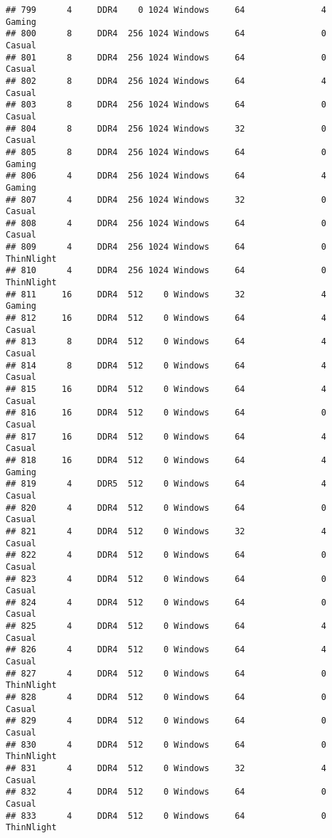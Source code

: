 \documentclass[
]{article}
\begin{document}
\begin{verbatim}
## 799      4     DDR4    0 1024 Windows     64               4     Gaming
## 800      8     DDR4  256 1024 Windows     64               0     Casual
## 801      8     DDR4  256 1024 Windows     64               0     Casual
## 802      8     DDR4  256 1024 Windows     64               4     Casual
## 803      8     DDR4  256 1024 Windows     64               0     Casual
## 804      8     DDR4  256 1024 Windows     32               0     Casual
## 805      8     DDR4  256 1024 Windows     64               0     Gaming
## 806      4     DDR4  256 1024 Windows     64               4     Gaming
## 807      4     DDR4  256 1024 Windows     32               0     Casual
## 808      4     DDR4  256 1024 Windows     64               0     Casual
## 809      4     DDR4  256 1024 Windows     64               0 ThinNlight
## 810      4     DDR4  256 1024 Windows     64               0 ThinNlight
## 811     16     DDR4  512    0 Windows     32               4     Gaming
## 812     16     DDR4  512    0 Windows     64               4     Casual
## 813      8     DDR4  512    0 Windows     64               4     Casual
## 814      8     DDR4  512    0 Windows     64               4     Casual
## 815     16     DDR4  512    0 Windows     64               4     Casual
## 816     16     DDR4  512    0 Windows     64               0     Casual
## 817     16     DDR4  512    0 Windows     64               4     Casual
## 818     16     DDR4  512    0 Windows     64               4     Gaming
## 819      4     DDR5  512    0 Windows     64               4     Casual
## 820      4     DDR4  512    0 Windows     64               0     Casual
## 821      4     DDR4  512    0 Windows     32               4     Casual
## 822      4     DDR4  512    0 Windows     64               0     Casual
## 823      4     DDR4  512    0 Windows     64               0     Casual
## 824      4     DDR4  512    0 Windows     64               0     Casual
## 825      4     DDR4  512    0 Windows     64               4     Casual
## 826      4     DDR4  512    0 Windows     64               4     Casual
## 827      4     DDR4  512    0 Windows     64               0 ThinNlight
## 828      4     DDR4  512    0 Windows     64               0     Casual
## 829      4     DDR4  512    0 Windows     64               0     Casual
## 830      4     DDR4  512    0 Windows     64               0 ThinNlight
## 831      4     DDR4  512    0 Windows     32               4     Casual
## 832      4     DDR4  512    0 Windows     64               0     Casual
## 833      4     DDR4  512    0 Windows     64               0 ThinNlight

\end{verbatim}
\end{document}
